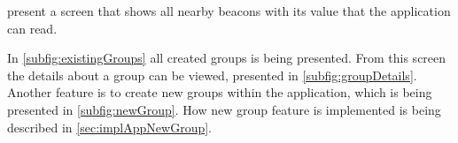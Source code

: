 \bigskip

 present a screen that shows all nearby beacons with its value that the application can read.

\bigskip

In \cref{subfig:existingGroups} all created groups is being presented.
From this screen the details about a group can be viewed, presented in \cref{subfig:groupDetails}.
Another feature is to create new groups within the application, which is being presented in \cref{subfig:newGroup}.
How new group feature is implemented is being described in \cref{sec:implAppNewGroup}.
